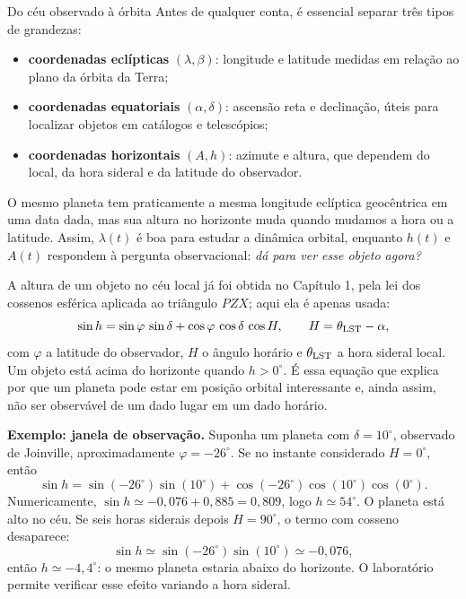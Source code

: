 \documentclass[11pt,a4paper]{article}
\begin{document}
\begin{lessonblock}{Do céu observado à órbita}
Antes de qualquer conta, é essencial separar três tipos de grandezas:
\begin{itemize}
\item \textbf{coordenadas eclípticas} $(\lambda,\beta)$: longitude e latitude medidas em relação ao plano da órbita da Terra;
\item \textbf{coordenadas equatoriais} $(\alpha,\delta)$: ascensão reta e declinação, úteis para localizar objetos em catálogos e telescópios;
\item \textbf{coordenadas horizontais} $(A,h)$: azimute e altura, que dependem do local, da hora sideral e da latitude do observador.
\end{itemize}
O mesmo planeta tem praticamente a mesma longitude eclíptica geocêntrica em uma data dada, mas sua altura no horizonte muda quando mudamos a hora ou a latitude. Assim, $\lambda(t)$ é boa para estudar a dinâmica orbital, enquanto $h(t)$ e $A(t)$ respondem à pergunta observacional: \textit{dá para ver esse objeto agora?}

A altura de um objeto no céu local já foi obtida no Capítulo 1, pela lei dos cossenos esférica aplicada ao triângulo $PZX$; aqui ela é apenas usada:
\[
\sin h=\sin\varphi\,\sin\delta+\cos\varphi\,\cos\delta\,\cos H,
\qquad
H=\theta_{\rm LST}-\alpha,
\]
com $\varphi$ a latitude do observador, $H$ o ângulo horário e $\theta_{\rm LST}$ a hora sideral local. Um objeto está acima do horizonte quando $h>0^\circ$. É essa equação que explica por que um planeta pode estar em posição orbital interessante e, ainda assim, não ser observável de um dado lugar em um dado horário.
\end{lessonblock}

\textbf{Exemplo: janela de observação.} Suponha um planeta com $\delta=10^\circ$, observado de Joinville, aproximadamente $\varphi=-26^\circ$. Se no instante considerado $H=0^\circ$, então
\[
\sin h=\sin(-26^\circ)\sin(10^\circ)+\cos(-26^\circ)\cos(10^\circ)\cos(0^\circ).
\]
Numericamente, $\sin h\simeq -0{,}076+0{,}885=0{,}809$, logo $h\simeq54^\circ$. O planeta está alto no céu. Se seis horas siderais depois $H=90^\circ$, o termo com cosseno desaparece:
\[
\sin h\simeq \sin(-26^\circ)\sin(10^\circ)\simeq -0{,}076,
\]
então $h\simeq -4{,}4^\circ$: o mesmo planeta estaria abaixo do horizonte. O laboratório permite verificar esse efeito variando a hora sideral.
\end{document}
